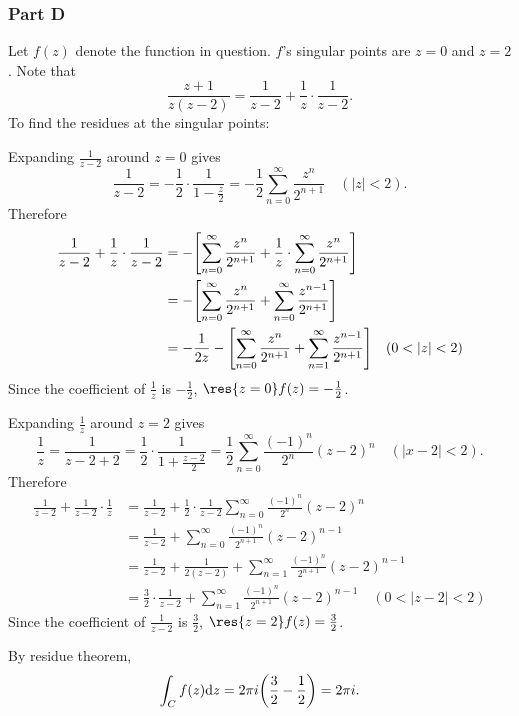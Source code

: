 \documentclass[12pt]{extarticle}
\begin{document}
\begin{problem} \subsubsection*{Part D}
    Let $f(z)$ denote the function in question. $f$'s singular points are $z = 0$ and $z = 2$. Note that
    \[
        \frac{z+1}{z(z-2)} = \frac{1}{z-2} + \frac{1}{z} \cdot \frac{1}{z-2}
    .\]
    To find the residues at the singular points:

    \begin{tcolorbox}
        Expanding $\frac{1}{z-2}$ around $z = 0$ gives
        \[
            \frac{1}{z-2} = -\frac{1}{2} \cdot \frac{1}{1 - \frac{z}{2}} = -\frac{1}{2}\sum_{n=0}^\infty \frac{z^n}{2^{n+1}} \hspace{1em} (|z| < 2)
        .\]
        Therefore
        \begin{align*}
            \frac{1}{z-2} + \frac{1}{z} \cdot \frac{1}{z-2} &= -\qty[\sum_{n=0}^\infty \frac{z^n}{2^{n+1}} + \frac{1}{z} \cdot \sum_{n=0}^\infty \frac{z^n}{2^{n+1}}] \\
            &= -\qty[\sum_{n=0}^\infty \frac{z^n}{2^{n+1}} + \sum_{n=0}^\infty \frac{z^{n-1}}{2^{n+1}}] \\
            &= -\frac{1}{2z} -\qty[\sum_{n=0}^\infty \frac{z^n}{2^{n+1}} + \sum_{n=1}^\infty \frac{z^{n-1}}{2^{n+1}}] \hspace{1em} (0 < |z| < 2)
        \end{align*}
        Since the coefficient of $\frac{1}{z}$ is $-\frac{1}{2}$, $\res{z = 0} f(z) = -\frac{1}{2}$. 
    \end{tcolorbox}

    \begin{tcolorbox}
        Expanding $\frac{1}{z}$ around $z = 2$ gives
        \[
            \frac{1}{z} = \frac{1}{z - 2 + 2} = \frac{1}{2} \cdot \frac{1}{1 + \frac{z-2}{2}} = \frac{1}{2} \sum_{n=0}^\infty \frac{(-1)^n}{2^n} (z-2)^n \hspace{1em} (|x-2| < 2)
        .\]
        Therefore
        \begin{align*}
            \frac{1}{z-2}  + \frac{1}{z-2} \cdot \frac{1}{z} &= \frac{1}{z-2} + \frac{1}{2} \cdot \frac{1}{z-2} \sum_{n=0}^\infty \frac{(-1)^n}{2^n} (z-2)^n \\
            &= \frac{1}{z-2} + \sum_{n=0}^\infty \frac{(-1)^n}{2^{n+1}} (z-2)^{n-1} \\
            &= \frac{1}{z-2} + \frac{1}{2(z-2)} + \sum_{n=1}^\infty \frac{(-1)^n}{2^{n+1}} (z-2)^{n-1} \\
            &= \frac{3}{2}\cdot\frac{1}{z-2} + \sum_{n=1}^\infty \frac{(-1)^n}{2^{n+1}} (z-2)^{n-1} \hspace{1em} (0 < |z-2| < 2)
        \end{align*}
        Since the coefficient of $\frac{1}{z-2}$ is $\frac{3}{2}$, $\res{z = 2} f(z) = \frac{3}{2}$. 
    \end{tcolorbox}

    By residue theorem,
    \[
        \int_C f(z) \dd z = 2 \pi i \qty(\frac{3}{2} - \frac{1}{2}) = 2 \pi i
    .\]
\end{problem}
\end{document}
